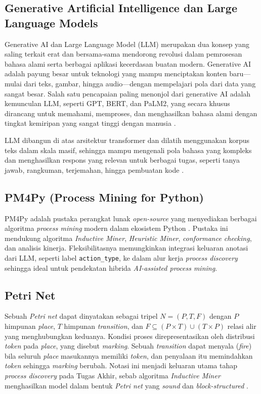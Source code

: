 \subsection{Generative Artificial Intelligence dan Large Language Models}
Generative AI dan Large Language Model (LLM) merupakan dua konsep yang saling terkait erat dan bersama-sama mendorong revolusi dalam pemrosesan bahasa alami serta berbagai aplikasi kecerdasan buatan modern. Generative AI adalah payung besar untuk teknologi yang mampu menciptakan konten baru---mulai dari teks, gambar, hingga audio---dengan mempelajari pola dari data yang sangat besar. Salah satu pencapaian paling menonjol dari generative AI adalah kemunculan LLM, seperti GPT, BERT, dan PaLM2, yang secara khusus dirancang untuk memahami, memproses, dan menghasilkan bahasa alami dengan tingkat kemiripan yang sangat tinggi dengan manusia \cite{hagos2024recentLLM}.

LLM dibangun di atas arsitektur transformer dan dilatih menggunakan korpus teks dalam skala masif, sehingga mampu mengenali pola bahasa yang kompleks dan menghasilkan respons yang relevan untuk berbagai tugas, seperti tanya jawab, rangkuman, terjemahan, hingga pembuatan kode \cite{yan2024generativeLLM}.

\subsection{PM4Py (Process Mining for Python)}
PM4Py adalah pustaka perangkat lunak \textit{open-source} yang menyediakan berbagai algoritma \textit{process mining} modern dalam ekosistem Python \cite{berti2019pm4py}. Pustaka ini mendukung algoritma \textit{Inductive Miner}, \textit{Heuristic Miner}, \textit{conformance checking}, dan analisis kinerja. Fleksibilitasnya memungkinkan integrasi keluaran anotasi dari LLM, seperti label \texttt{action\_type}, ke dalam alur kerja \textit{process discovery} sehingga ideal untuk pendekatan hibrida \textit{AI-assisted process mining}.

\subsection{Petri Net}
Sebuah \textit{Petri net} dapat dinyatakan sebagai tripel $N = (P, T, F)$ dengan $P$ himpunan \textit{place}, $T$ himpunan \textit{transition}, dan $F \subseteq (P \times T) \cup (T \times P)$ relasi alir yang menghubungkan keduanya. Kondisi proses direpresentasikan oleh distribusi \textit{token} pada \textit{place}, yang disebut \textit{marking}. Sebuah \textit{transition} dapat menyala (\textit{fire}) bila seluruh \textit{place} masukannya memiliki \textit{token}, dan penyalaan itu memindahkan \textit{token} sehingga \textit{marking} berubah. Notasi ini menjadi keluaran utama tahap \textit{process discovery} pada Tugas Akhir, sebab algoritma \textit{Inductive Miner} menghasilkan model dalam bentuk \textit{Petri net} yang \textit{sound} dan \textit{block-structured} \cite{vanderAalst2016_process_mining}.

